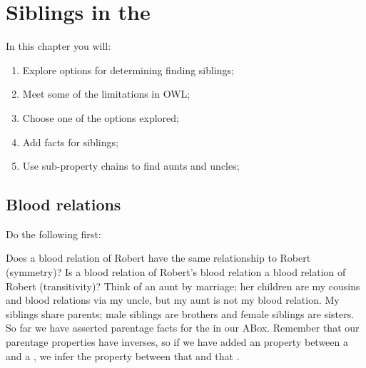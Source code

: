 \chapter{Siblings in the \fhkb}
\label{chap:sibs}

In this chapter you will:
\begin{enumerate}
\item Explore options for determining finding siblings;
\item Meet some of the limitations in OWL;
\item Choose one of the options explored;
\item Add facts for siblings;
\item Use sub-property chains to find aunts and uncles;
\end{enumerate}


\section{Blood relations}
\label{sec:br}

Do the following first:

Does a blood relation of Robert have the same relationship to Robert (symmetry)? Is a blood relation of Robert's blood relation a blood relation of Robert (transitivity)? Think of an aunt by marriage; her children are my cousins and blood relations via my uncle, but my aunt is not my blood relation. My siblings share parents; male siblings are brothers and female siblings are sisters. So far we have asserted parentage facts for the \person in our ABox. Remember that our parentage properties have inverses, so if we have added an  property between a \person and a \man, we infer the  property between that \man and that \person. 

